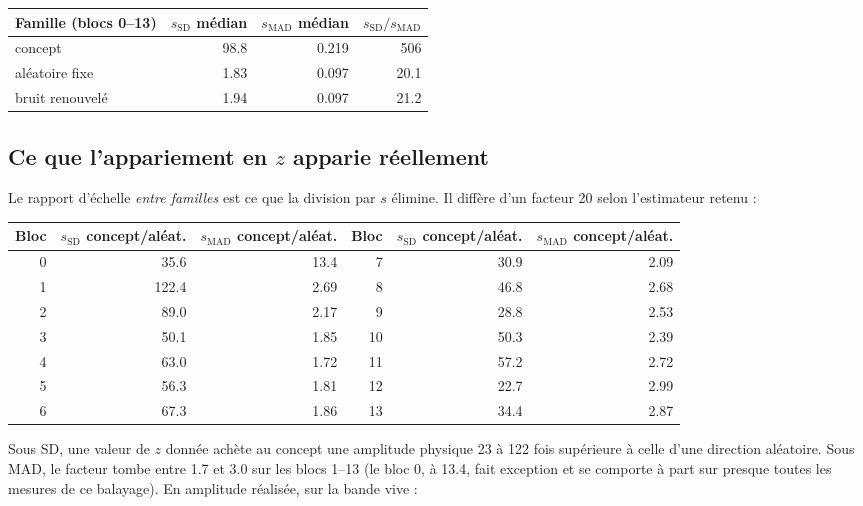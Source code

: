 \documentclass[11pt,a4paper]{article}
\newcommand{\ssd}{s_{\mathrm{SD}}}
\newcommand{\smad}{s_{\mathrm{MAD}}}
\begin{document}
\begin{center}
\begin{tabular}{lrrr}
\toprule
Famille (blocs 0--13) & $\ssd$ médian & $\smad$ médian & $\ssd/\smad$ \\
\midrule
concept          & \num{98.8} & \num{0.219} & \num{506} \\
aléatoire fixe   & \num{1.83} & \num{0.097} & \num{20.1} \\
bruit renouvelé  & \num{1.94} & \num{0.097} & \num{21.2} \\
\bottomrule
\end{tabular}
\end{center}

\subsection{Ce que l'appariement en \texorpdfstring{$z$}{z} apparie réellement}

Le rapport d'échelle \emph{entre familles} est ce que la division par $s$ élimine. Il
diffère d'un facteur \num{20} selon l'estimateur retenu :

\begin{center}
\begin{tabular}{rrr|rrr}
\toprule
Bloc & $\ssd$ concept/aléat. & $\smad$ concept/aléat. &
Bloc & $\ssd$ concept/aléat. & $\smad$ concept/aléat. \\
\midrule
0 & \num{35.6}  & \num{13.4} & 7  & \num{30.9} & \num{2.09} \\
1 & \num{122.4} & \num{2.69} & 8  & \num{46.8} & \num{2.68} \\
2 & \num{89.0}  & \num{2.17} & 9  & \num{28.8} & \num{2.53} \\
3 & \num{50.1}  & \num{1.85} & 10 & \num{50.3} & \num{2.39} \\
4 & \num{63.0}  & \num{1.72} & 11 & \num{57.2} & \num{2.72} \\
5 & \num{56.3}  & \num{1.81} & 12 & \num{22.7} & \num{2.99} \\
6 & \num{67.3}  & \num{1.86} & 13 & \num{34.4} & \num{2.87} \\
\bottomrule
\end{tabular}
\end{center}

\noindent
Sous SD, une valeur de $z$ donnée achète au concept une amplitude physique \num{23} à
\num{122} fois supérieure à celle d'une direction aléatoire. Sous MAD, le facteur tombe
entre \num{1.7} et \num{3.0} sur les blocs 1--13 (le bloc 0, à \num{13.4}, fait
exception et se comporte à part sur presque toutes les mesures de ce balayage). En
amplitude réalisée, sur la bande vive :
\end{document}
